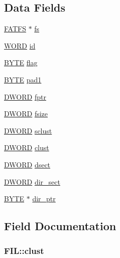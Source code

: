 \subsection*{Data Fields}
\begin{DoxyCompactItemize}
\item 
\hyperlink{structFATFS}{F\-A\-T\-F\-S} $\ast$ \hyperlink{structFIL_a42376a6797a06228911c8b836c1e9030}{fs}
\item 
\hyperlink{integer_8h_a197942eefa7db30960ae396d68339b97}{W\-O\-R\-D} \hyperlink{structFIL_af7cae0063b0045fb7078b560101ba8f2}{id}
\item 
\hyperlink{integer_8h_a4ae1dab0fb4b072a66584546209e7d58}{B\-Y\-T\-E} \hyperlink{structFIL_ac409508881f5a16f2998ae675072b376}{flag}
\item 
\hyperlink{integer_8h_a4ae1dab0fb4b072a66584546209e7d58}{B\-Y\-T\-E} \hyperlink{structFIL_a17f891ef69059bd879f6492473cfceae}{pad1}
\item 
\hyperlink{integer_8h_ad342ac907eb044443153a22f964bf0af}{D\-W\-O\-R\-D} \hyperlink{structFIL_a75d29cf9257c827d117887b9f924c4a9}{fptr}
\item 
\hyperlink{integer_8h_ad342ac907eb044443153a22f964bf0af}{D\-W\-O\-R\-D} \hyperlink{structFIL_aa00790d40d7b0081c345fd4f76e22b70}{fsize}
\item 
\hyperlink{integer_8h_ad342ac907eb044443153a22f964bf0af}{D\-W\-O\-R\-D} \hyperlink{structFIL_ad308b74c8d6975c6a9c30d90b4124c40}{sclust}
\item 
\hyperlink{integer_8h_ad342ac907eb044443153a22f964bf0af}{D\-W\-O\-R\-D} \hyperlink{structFIL_aa41312aba551b9a6d1c9d3c8c7d2734b}{clust}
\item 
\hyperlink{integer_8h_ad342ac907eb044443153a22f964bf0af}{D\-W\-O\-R\-D} \hyperlink{structFIL_ab3d4165d6fd32ac71a130d835fbf0b4d}{dsect}
\item 
\hyperlink{integer_8h_ad342ac907eb044443153a22f964bf0af}{D\-W\-O\-R\-D} \hyperlink{structFIL_ab203794f939ad4480e81dfa488770783}{dir\-\_\-sect}
\item 
\hyperlink{integer_8h_a4ae1dab0fb4b072a66584546209e7d58}{B\-Y\-T\-E} $\ast$ \hyperlink{structFIL_a5af9e9fb312b629220eaf684dd28c4a9}{dir\-\_\-ptr}
\end{DoxyCompactItemize}


\subsection{Field Documentation}
\hypertarget{structFIL_aa41312aba551b9a6d1c9d3c8c7d2734b}{
\subsubsection[{clust}]{ F\-I\-L\-::clust}}\label{structFIL_aa41312aba551b9a6d1c9d3c8c7d2734b}


